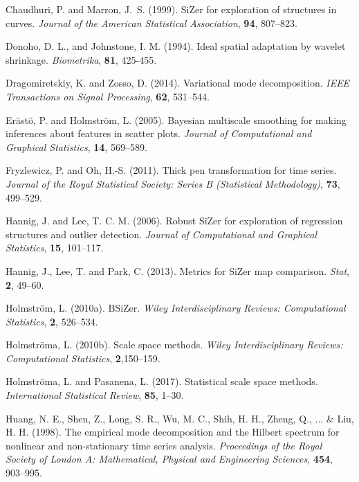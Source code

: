 \documentclass[12pt]{article}
\begin{document}
\begin{description}
\item Chaudhuri, P. and Marron, J.~S. (1999).  SiZer for exploration of structures in curves.  {\it Journal of the American Statistical Association}, {\bf 94}, 807--823.

\item Donoho, D. L., and Johnstone, I. M. (1994). Ideal spatial adaptation by wavelet shrinkage. {\it Biometrika}, {\bf 81}, 425-455.

\item Dragomiretskiy, K. and Zosso, D. (2014). Variational mode decomposition. {\it IEEE Transactions on Signal Processing}, {\bf 62}, 531--544.

\item Er\"ast\"o, P. and Holmstr\"om, L. (2005). Bayesian multiscale smoothing for making inferences about features in scatter plots. {\it Journal of Computational and Graphical Statistics}, {\bf 14}, 569--589.

\item Fryzlewicz, P. and Oh, H.-S. (2011). Thick pen transformation for time series. {\it Journal of the Royal Statistical Society: Series B (Statistical Methodology)}, {\bf 73}, 499--529.

\item Hannig, J. and Lee, T. C. M. (2006). Robust SiZer for exploration of regression structures and outlier detection. {\it Journal of Computational and Graphical Statistics}, {\bf 15}, 101--117.

\item Hannig, J., Lee, T. and Park, C. (2013). Metrics for SiZer map comparison. {\it Stat}, {\bf 2}, 49--60.

\item Holmstr\"om, L. (2010a). BSiZer.  {\it Wiley Interdisciplinary Reviews: Computational Statistics}, {\bf 2}, 526--534. 

\item Holmstr\"oma, L. (2010b). Scale space methods. {\it Wiley Interdisciplinary Reviews: Computational Statistics}, {\bf 2},150--159.

\item Holmstr\"oma, L. and Pasanena, L. (2017). Statistical scale space methods. {\it International Statistical Review}, {\bf 85}, 1--30.  

\item Huang, N. E., Shen, Z., Long, S. R., Wu, M. C., Shih, H. H., Zheng, Q., ... \& Liu, H. H. (1998). The empirical mode decomposition and the Hilbert spectrum for nonlinear and non-stationary time series analysis. {\it Proceedings of the Royal Society of London A: Mathematical, Physical and Engineering Sciences}, {\bf 454},  903--995. 


\end{description}
\end{document}

